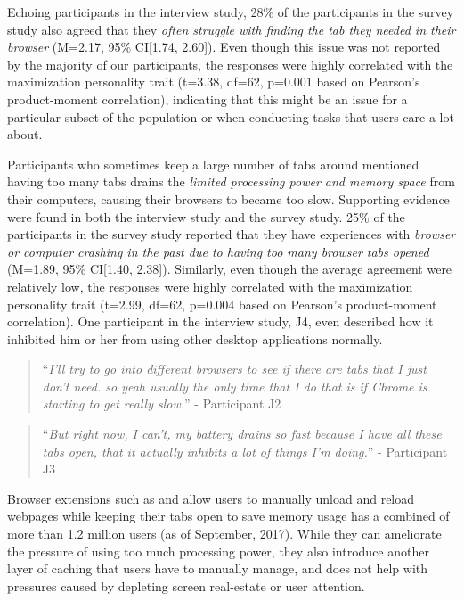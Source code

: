 Echoing participants in the interview study, 28\% of the participants  in the survey study also agreed that they \emph{often struggle with finding the tab they needed in their browser} (M=2.17, 95\% CI[1.74, 2.60]). Even though this issue was not reported by the majority of our participants, the responses were highly correlated with the maximization personality trait (t=3.38, df=62, p=0.001 based on Pearson's product-moment correlation), indicating that this might be an issue for a particular subset of the population or when conducting tasks that users care a lot about.

Participants who sometimes keep a large number of tabs around mentioned having too many tabs drains the \emph{limited processing power and memory space} from their computers, causing their browsers to became too slow. Supporting evidence were found in both the interview study and the survey study. 25\% of the participants in the survey study reported that they have experiences with \emph{browser or computer crashing in the past due to having too many browser tabs opened} (M=1.89, 95\% CI[1.40, 2.38]). Similarly, even though the average agreement were relatively low, the responses were highly correlated with the maximization personality trait (t=2.99, df=62, p=0.004 based on Pearson's product-moment correlation). One participant in the interview study, J4, even described how it inhibited him or her from using other desktop applications normally. 

\begin{quote}
``\emph{I'll try to go into different browsers to see if there are tabs that I just don't need. so yeah usually the only time that I do that is if Chrome is starting to get really slow.}'' - Participant J2

\end{quote}
\begin{quote}
``\emph{But right now, I can't, my battery drains so fast because I have all these tabs open, that it actually inhibits a lot of things I'm doing.}'' - Participant J3
\end{quote}

Browser extensions such as \cite{suspend1} and \cite{suspend2} allow users to manually unload and reload webpages while keeping their tabs open to save memory usage has a combined of more than 1.2 million users (as of September, 2017). While they can ameliorate the pressure of using too much processing power, they also introduce another layer of caching that users have to manually manage, and does not help with pressures caused by depleting screen real-estate or user attention.

